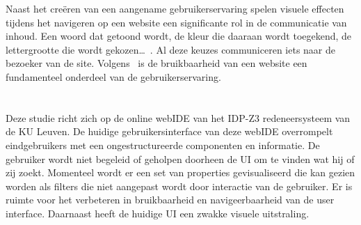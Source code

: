 Naast het creëren van een aangename gebruikerservaring spelen visuele effecten tijdens het navigeren op een website een significante rol in de communicatie van inhoud. Een woord dat getoond wordt, de kleur die daaraan wordt toegekend, de lettergrootte die wordt gekozen…~\autocite{bordbar2016}. Al deze keuzes communiceren iets naar de bezoeker van de site. Volgens~\textcite{Lee2012} is de bruikbaarheid van een website een fundamenteel onderdeel van de gebruikerservaring.

\section{}%
\label{sec:probleemstelling}
Deze studie richt zich op de online webIDE van het IDP-Z3 redeneersysteem van de KU Leuven. De huidige gebruikersinterface van deze webIDE overrompelt eindgebruikers met een ongestructureerde componenten en informatie. De gebruiker wordt niet begeleid of geholpen doorheen de UI om te vinden wat hij of zij zoekt. Momenteel wordt er een set van properties gevisualiseerd die kan gezien worden als filters die niet aangepast wordt door interactie van de gebruiker. Er is ruimte voor het verbeteren in bruikbaarheid en navigeerbaarheid van de user interface. Daarnaast heeft de huidige UI een zwakke visuele uitstraling.


